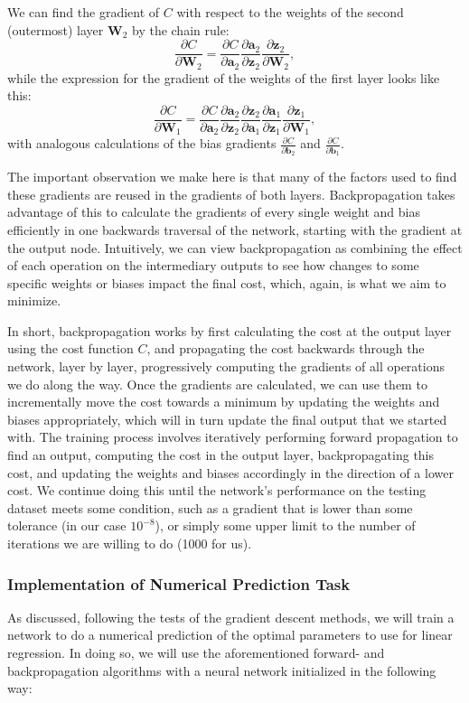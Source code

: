 We can find the gradient of $C$ with respect to the weights of the second (outermost) layer $\mathbf W_2$ by the chain rule:
\[\frac{\partial C}{\partial \mathbf W_2} = \frac{\partial C}{\partial \boldsymbol a_2}
\frac{\partial \boldsymbol a_2}{\partial \boldsymbol z_2}
\frac{\partial \boldsymbol z_2}{\partial \mathbf W_2},\]
while the expression for the gradient of the weights of the first layer looks like this:
\[\frac{\partial C}{\partial \mathbf W_1} = \frac{\partial C}{\partial \boldsymbol a_2}
\frac{\partial \boldsymbol a_2}{\partial \boldsymbol z_2}
\frac{\partial \boldsymbol z_2}{\partial \boldsymbol a_1}
\frac{\partial \boldsymbol a_1}{\partial \boldsymbol z_1}
\frac{\partial \boldsymbol z_1}{\partial \mathbf W_1},\]
with analogous calculations of the bias gradients $\frac{\partial C}{\partial \boldsymbol b_2}$ and $\frac{\partial C}{\partial \boldsymbol b_1}$. 

The important observation we make here is that many of the factors used to find these gradients are reused in the gradients of both layers. Backpropagation takes advantage of this to calculate the gradients of every single weight and bias efficiently in one backwards traversal of the network, starting with the gradient at the output node. Intuitively, we can view backpropagation as combining the effect of each operation on the intermediary outputs to see how changes to some specific weights or biases impact the final cost, which, again, is what we aim to minimize. 

In short, backpropagation works by first calculating the cost at the output layer using the cost function $C$, and propagating the cost backwards through the network, layer by layer, progressively computing the gradients of all operations we do along the way. Once the gradients are calculated, we can use them to incrementally move the cost towards a minimum by updating the weights and biases appropriately, which will in turn update the final output that we started with. The training process involves iteratively performing forward propagation to find an output, computing the cost in the output layer, backpropagating this cost, and updating the weights and biases accordingly in the direction of a lower cost. We continue doing this until the network's performance on the testing dataset meets some condition, such as a gradient that is lower than some tolerance (in our case $10^{-8}$), or simply some upper limit to the number of iterations we are willing to do (1000 for us).

\subsubsection{Implementation of Numerical Prediction Task} %
As discussed, following the tests of the gradient descent methods, we will train a network to do a numerical prediction of the optimal parameters to use for linear regression. In doing so, we will use the aforementioned forward- and backpropagation algorithms with a neural network initialized in the following way:\\

